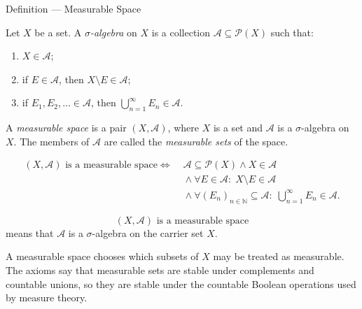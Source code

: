 \begin{definitionbox}{Definition --- Measurable Space}
\begin{definition}\label{def:measurable-space}
Let \(X\) be a set.  A \emph{\(\sigma\)-algebra} on \(X\) is a collection
\(\mathcal{A}\subseteq\mathcal{P}(X)\) such that:
\begin{enumerate}
  \item \(X\in\mathcal{A}\);
  \item if \(E\in\mathcal{A}\), then \(X\setminus E\in\mathcal{A}\);
  \item if \(E_1,E_2,\ldots\in\mathcal{A}\), then
        \(\bigcup_{n=1}^{\infty}E_n\in\mathcal{A}\).
\end{enumerate}
A \emph{measurable space} is a pair \((X,\mathcal{A})\), where \(X\) is a set
and \(\mathcal{A}\) is a \(\sigma\)-algebra on \(X\).  The members of
\(\mathcal{A}\) are called the \emph{measurable sets} of the space.
\end{definition}
\end{definitionbox}

\begin{remark*}
\[
\begin{aligned}
\text{\((X,\mathcal{A})\) is a measurable space}
\Longleftrightarrow\;&
\mathcal{A}\subseteq\mathcal{P}(X)
\land X\in\mathcal{A}
\\
&{}\land
\forall E\in\mathcal{A}{:}\;X\setminus E\in\mathcal{A}
\\
&{}\land
\forall (E_n)_{n\in\mathbb{N}}\subseteq\mathcal{A}{:}\;
\bigcup_{n=1}^{\infty}E_n\in\mathcal{A}.
\end{aligned}
\]
\end{remark*}

\begin{remark*}
\[
\text{\((X,\mathcal{A})\) is a measurable space}
\]
means that \(\mathcal{A}\) is a \(\sigma\)-algebra on the carrier set \(X\).
\end{remark*}

\begin{remark*}[Interpretation]
A measurable space chooses which subsets of \(X\) may be treated as measurable.
The axioms say that measurable sets are stable under complements and countable
unions, so they are stable under the countable Boolean operations used by
measure theory.
\end{remark*}

\DefinitionalRoot
